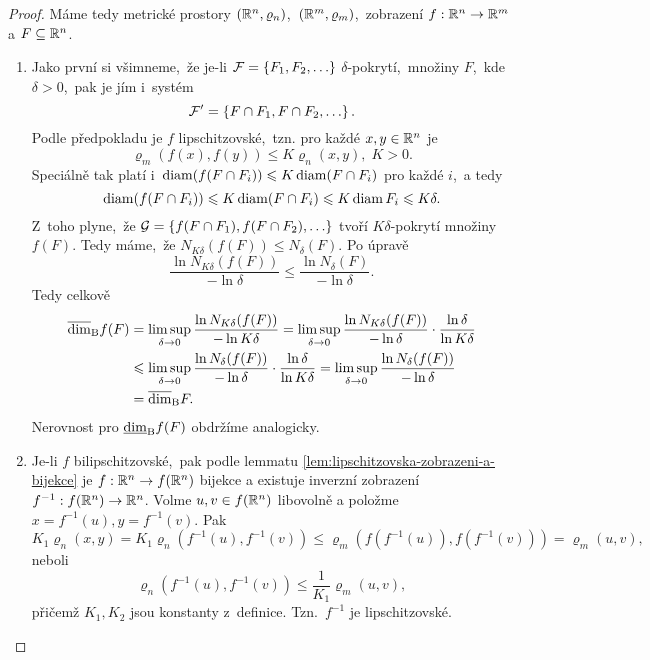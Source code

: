 \begin{proof}
    Máme tedy metrické prostory $(\mathbb{R}^n,\varrho_n)$,~$(\mathbb{R}^m,\varrho_m)$,~zobrazení $f:\mathbb{R}^n \rightarrow \mathbb{R}^m$ a $F\subseteq\mathbb{R}^n$.
    \begin{enumerate}[label=\textit{(\roman*)}]
        \item Jako první si všimneme,~že je-li $\mathcal{F}=\left\{F_1,F_2,\ldots\right\}$ $\delta$-pokrytí,~množiny $F$,~kde $\delta>0$,~pak je jím i~systém
        \[\mathcal{F}^\prime=\left\{F\cap F_1,F\cap F_2,\ldots\right\}.\]
        Podle předpokladu je $f$ lipschitzovské,~tzn. pro každé $x,y\in\mathbb{R}^n$ je
        \[\varrho_m(f(x),f(y))\leqslant K\varrho_n(x,y),\;K>0.\]
        Speciálně tak platí i~$\operatorname{diam}(f(F\cap F_i))\leqslant K\operatorname{diam}(F\cap F_i)$ pro každé $i$,~a tedy
        \[\operatorname{diam}(f(F\cap F_i))\leqslant K\operatorname{diam}(F\cap F_i)\leqslant K\operatorname{diam}{F_i}\leqslant K\delta.\]
        Z~toho plyne,~že $\mathcal{G}=\left\{f(F\cap F_1),f(F\cap F_2),\ldots\right\}$ tvoří $K\delta$-pokrytí množiny $f(F)$. Tedy máme,~že $N_{K\delta}(f(F))\leqslant N_\delta(F)$. Po úpravě
        \[\dfrac{\ln{N_{K\delta}(f(F))}}{-\ln{\delta}}\leqslant\dfrac{\ln{N_\delta(F)}}{-\ln{\delta}}.\]
        Tedy celkově
        \begin{align*}
            \overline{\dim}_\textup{B}{f(F)}&=\limsup_{\delta\to 0}\dfrac{\ln{N_{K\delta}(f(F))}}{-\ln{K\delta}}=\limsup_{\delta\to 0}\dfrac{\ln{N_{K\delta}(f(F))}}{-\ln{\delta}}\cdot\dfrac{\ln{\delta}}{\ln{K\delta}}\\
            &\leqslant\limsup_{\delta\to 0}\dfrac{\ln{N_{\delta}(f(F))}}{-\ln{\delta}}\cdot\dfrac{\ln{\delta}}{\ln{K\delta}}=\limsup_{\delta\to 0}\dfrac{\ln{N_{\delta}(f(F))}}{-\ln{\delta}}\\
            &=\overline{\dim}_\textup{B}{F}.
        \end{align*}
        Nerovnost pro $\underline{\dim}_\textup{B}{f(F)}$ obdržíme analogicky.
        \item Je-li $f$ bilipschitzovské,~pak podle lemmatu \ref{lem:lipschitzovska-zobrazeni-a-bijekce} je $f:\mathbb{R}^n \rightarrow f(\mathbb{R}^n)$ bijekce a existuje inverzní zobrazení $f^{-1}:f(\mathbb{R}^n) \rightarrow \mathbb{R}^n$. Volme $u,v\in f(\mathbb{R}^n)$ libovolně a položme $x=f^{-1}(u),y=f^{-1}(v)$. Pak
        \[K_1\varrho_n(x,y)=K_1\varrho_n(f^{-1}(u),f^{-1}(v))\leqslant\varrho_m(f(f^{-1}(u)),f(f^{-1}(v)))=\varrho_m(u,v),\]
        neboli
        \[\varrho_n(f^{-1}(u),f^{-1}(v))\leqslant\dfrac{1}{K_1}\varrho_m(u,v),\]
        přičemž $K_1,K_2$ jsou konstanty z~definice. Tzn.~$f^{-1}$ je lipschitzovské.


\end{enumerate}
\end{proof}
